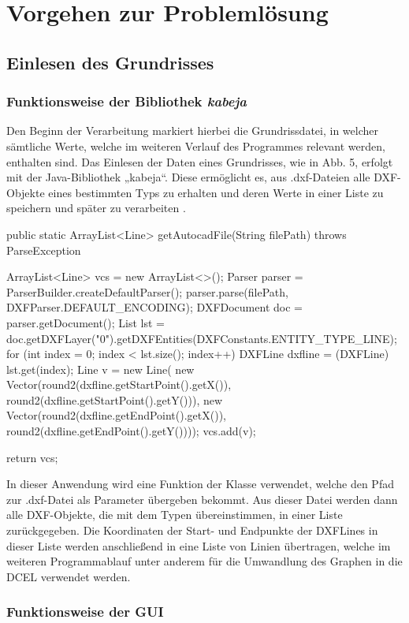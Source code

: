 \chapter{Vorgehen zur Problemlösung}
\section{Einlesen des Grundrisses}
\subsection{Funktionsweise der Bibliothek \textit{kabeja}}
Den Beginn der Verarbeitung markiert hierbei die Grundrissdatei, in welcher sämtliche Werte, welche im weiteren Verlauf des Programmes relevant werden, enthalten sind.
Das Einlesen der Daten eines Grundrisses, wie in Abb. 5, erfolgt mit der Java-Bibliothek „kabeja“. 
Diese ermöglicht es, aus .dxf-Dateien alle DXF-Objekte eines bestimmten Typs zu erhalten und deren Werte in einer Liste zu speichern und später zu verarbeiten \cite{kabeja}.
\begin{code}
public static ArrayList<Line> getAutocadFile(String filePath) throws ParseException {
	ArrayList<Line> vcs = new ArrayList<>();
	Parser parser = ParserBuilder.createDefaultParser();
	parser.parse(filePath, DXFParser.DEFAULT_ENCODING);
	DXFDocument doc = parser.getDocument();
	List lst = doc.getDXFLayer("0").getDXFEntities(DXFConstants.ENTITY_TYPE_LINE);
	for (int index = 0; index < lst.size(); index++) {
		DXFLine dxfline = (DXFLine) lst.get(index);
		Line v = new Line(
		new Vector(round2(dxfline.getStartPoint().getX()), round2(dxfline.getStartPoint().getY())),
		new Vector(round2(dxfline.getEndPoint().getX()), round2(dxfline.getEndPoint().getY())));
		vcs.add(v);
	}
	
	return vcs;
}
\end{code}
In dieser Anwendung wird eine Funktion der Klasse  verwendet, welche den Pfad zur .dxf-Datei als Parameter übergeben bekommt. 
Aus dieser Datei werden dann alle DXF-Objekte, die mit dem Typen  übereinstimmen, in einer Liste zurückgegeben. 
Die Koordinaten der Start- und Endpunkte der DXFLines  in dieser Liste werden anschließend in eine Liste von Linien übertragen, welche im weiteren Programmablauf unter anderem für die Umwandlung des Graphen in die DCEL verwendet werden.
\subsection{Funktionsweise der GUI}
